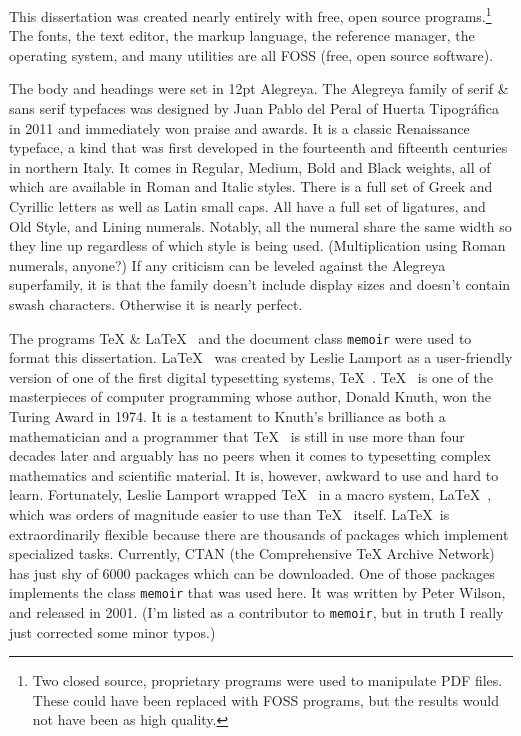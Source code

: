 This dissertation was created nearly entirely with free, open source programs.\footnote{Two closed source, proprietary programs were used to manipulate PDF files. These could have been replaced with FOSS programs, but the results would not have been as high quality.} The fonts, the text editor, the markup language, the reference manager, the operating system, and many utilities are all FOSS (free, open source software).
\begin{center}
  \textbf{\qquad{}\qquad{}\qquad{}\qquad{}}
\end{center}
The body and headings were set in 12pt Alegreya. The Alegreya family of serif \& sans serif typefaces was designed by Juan Pablo del Peral of Huerta Tipográfica in 2011 and immediately won praise and awards. It is a classic Renaissance typeface, a kind that was first developed in the fourteenth and fifteenth centuries in northern Italy. It comes in Regular, Medium, Bold and Black weights, all of which are available in Roman and Italic styles. There is a full set of Greek and Cyrillic letters as well as Latin small caps. All have a full set of ligatures, and Old Style, and Lining numerals. Notably, all the numeral share the same width so they line up regardless of which style is being used. (Multiplication using Roman numerals, anyone?) If any criticism can be leveled against the Alegreya superfamily, it is that the family doesn't include display sizes and doesn't contain swash characters. Otherwise it is nearly perfect.
\begin{center}
  \textbf{\quad\quad{}\quad\quad{}\quad\quad{}\quad\quad{}}
\end{center}
The programs \TeX{} \& \LaTeX{}  and the document class \texttt{memoir} were used to format this dissertation. \LaTeX  was created by Leslie Lamport as a user-friendly version of one of the first digital typesetting systems, \TeX . \TeX  is one of the masterpieces of computer programming whose author, Donald Knuth, won the Turing Award in 1974. It is a testament to Knuth's brilliance as both a mathematician and a programmer that \TeX  is still in use more than four decades later and arguably has no peers when it comes to typesetting complex mathematics and scientific material. It is, however, awkward to use and hard to learn. Fortunately, Leslie Lamport wrapped \TeX  in a macro system, \LaTeX , which was orders of magnitude easier to use than \TeX  itself.
LaTeX is extraordinarily flexible because there are thousands of packages which implement specialized tasks. Currently, CTAN (the Comprehensive TeX Archive Network) has just shy of 6000 packages which can be downloaded. One of those packages implements the class \texttt{memoir} that was used here. It was written by Peter Wilson, and released in 2001. (I'm listed as a contributor to \texttt{memoir}, but in truth I really just corrected some minor typos.)
